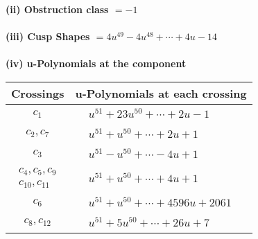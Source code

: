 \documentclass[1p]{elsarticle_modified}
\theoremstyle{definition}
\begin{document}
\flushleft \textbf{(ii) Obstruction class $= -1$}\\~\\
\flushleft \textbf{(iii) Cusp Shapes $= 4 u^{49}-4 u^{48}+\cdots+4 u-14$}\\~\\
\newpage\renewcommand{\arraystretch}{1}
\flushleft \textbf{(iv) u-Polynomials at the component}\newline \\
\begin{tabular}{m{50pt}|m{274pt}}
Crossings & \hspace{64pt}u-Polynomials at each crossing \\
\hline $$\begin{aligned}c_{1}\end{aligned}$$&$\begin{aligned}
&u^{51}+23 u^{50}+\cdots+2 u-1
\end{aligned}$\\
\hline $$\begin{aligned}c_{2},c_{7}\end{aligned}$$&$\begin{aligned}
&u^{51}+u^{50}+\cdots+2 u+1
\end{aligned}$\\
\hline $$\begin{aligned}c_{3}\end{aligned}$$&$\begin{aligned}
&u^{51}- u^{50}+\cdots-4 u+1
\end{aligned}$\\
\hline $$\begin{aligned}c_{4},c_{5},c_{9}\\c_{10},c_{11}\end{aligned}$$&$\begin{aligned}
&u^{51}+u^{50}+\cdots+4 u+1
\end{aligned}$\\
\hline $$\begin{aligned}c_{6}\end{aligned}$$&$\begin{aligned}
&u^{51}+u^{50}+\cdots+4596 u+2061
\end{aligned}$\\
\hline $$\begin{aligned}c_{8},c_{12}\end{aligned}$$&$\begin{aligned}
&u^{51}+5 u^{50}+\cdots+26 u+7
\end{aligned}$\\
\hline
\end{tabular}\\~\\
\end{document}
